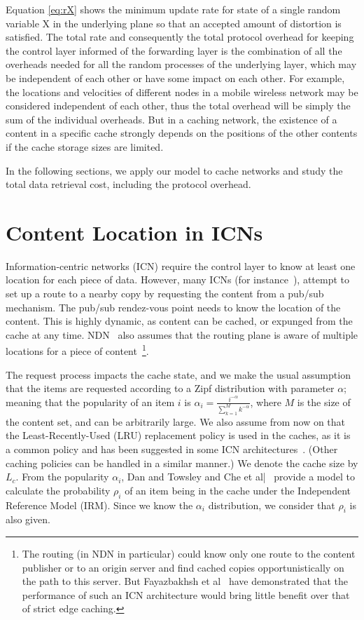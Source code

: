 \documentclass[conference]{IEEEtran}
\theoremstyle{plain}
\theoremstyle{remark}
\begin{document}
Equation \ref{eq:rX} shows the minimum update rate for state of a single random variable X in the underlying plane so that an accepted amount of distortion is satisfied. The total rate and consequently the total protocol overhead for keeping the control layer informed of the forwarding layer is the combination of all the overheads needed for all the random processes of the underlying layer, which may be independent of each other or have some impact on each other.
For example, the locations and velocities of different nodes in a mobile wireless network may be considered independent of each other, thus the total overhead will be simply the sum of the individual overheads. But in a caching network, the existence of a content in a specific cache strongly depends on the positions of the other contents if the cache storage sizes are limited.

In the following sections, we apply our model to cache networks and study the total data retrieval cost, including the protocol overhead.

\section{Content Location in ICNs}
\label{sec:scenarios}

Information-centric networks (ICN) require the control layer to know at least one location for each piece of data. However, many ICNs (for instance~\cite{Pursuit}), attempt to set up a route to a nearby copy by requesting the content from a pub/sub mechanism. The pub/sub rendez-vous point needs to know the location of the content. This is highly dynamic, as content can be cached, or expunged from the cache at any time. NDN~\cite{Zhang2010Named} also assumes that the routing plane is aware of multiple locations for a piece of content~\footnote{The routing (in NDN in particular) could know only one route to the content publisher or to an origin server and find cached copies opportunistically on the path to this server. But Fayazbakhsh et al~\cite{Fayazbakhsh2013Less} have demonstrated that the performance of such an ICN architecture would bring little benefit over that of strict edge caching.}.

The request process impacts the cache state, and we make the usual assumption that the items are requested according to a Zipf distribution with parameter $\alpha$; meaning that the popularity of an item $i$ is $\alpha_i=\frac{i^{-\alpha}}{\sum_{k=1}^M k^{-\alpha}}$, where $M$ is the size of the content set, and can be arbitrarily large. We also assume from now on that the Least-Recently-Used (LRU) replacement policy is used in the caches, as it is a common policy and has been suggested in some ICN architectures~\cite{Jacobson2009Networking}. (Other caching policies can be handled in a similar manner.) We denote the cache size by $L_c$. From the popularity $\alpha_i$, Dan and Towsley \cite{Dan1990Approximate}  and Che et al|~\cite{Che2002Hierarchical} provide a model to calculate the probability $\rho_i$ of an item being in the cache under the Independent Reference Model (IRM). Since we know the $\alpha_i$ distribution, we consider that $\rho_i$ is also given.
\end{document}
